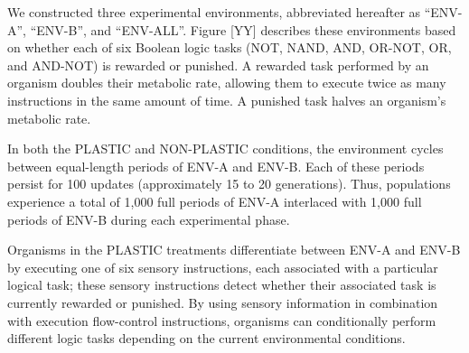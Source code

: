 
We constructed three experimental environments, abbreviated hereafter as ``ENV-A'', ``ENV-B'', and ``ENV-ALL''.
Figure [YY] describes these environments based on whether each of six Boolean logic tasks (NOT, NAND, AND, OR-NOT, OR, and AND-NOT) is rewarded or punished.
A rewarded task performed by an organism doubles their metabolic rate, allowing them to execute twice as many instructions in the same amount of time.
A punished task halves an organism's metabolic rate. 




In both the PLASTIC and NON-PLASTIC conditions, the environment cycles between equal-length periods of ENV-A and ENV-B.
Each of these periods persist for 100 updates (approximately 15 to 20 generations).
Thus, populations experience a total of 1,000 full periods of ENV-A interlaced with 1,000 full periods of ENV-B during each experimental phase.

Organisms in the PLASTIC treatments differentiate between ENV-A and ENV-B by executing one of six sensory instructions, each associated with a particular logical task; these sensory instructions detect whether their associated task is currently rewarded or punished.
By using sensory information in combination with execution flow-control instructions, organisms can conditionally perform different logic tasks depending on the current environmental conditions.

